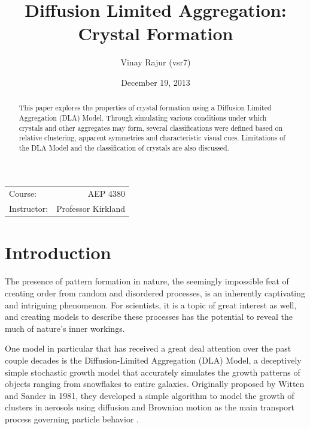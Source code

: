\documentclass{article}
\title{Diffusion Limited Aggregation: Crystal Formation} %
\author{Vinay Rajur (vsr7)} %
\date{December 19, 2013} %
\begin{document}
\maketitle %

\begin{center}
\begin{tabular}{l r}
Course: & AEP 4380 \\ %
Instructor: & Professor Kirkland %
\end{tabular}
\end{center}

\begin{abstract}
This paper explores the properties of crystal formation using a Diffusion Limited Aggregation (DLA) Model. Through simulating various conditions under which crystals and other aggregates may form, several classifications were defined based on relative clustering, apparent symmetries and characteristic visual cues. Limitations of the DLA Model and the classification of crystals are also discussed.\\
\end{abstract}


\section{Introduction}

The presence of pattern formation in nature, the seemingly impossible feat of creating order from random and disordered processes, is an inherently captivating and intriguing phenomenon. For scientists, it is a topic of great interest as well, and creating models to describe these processes has the potential to reveal the much of nature's inner workings.

One model in particular that has received a great deal attention over the past couple decades is the Diffusion-Limited Aggregation (DLA) Model, a deceptively simple stochastic growth model that accurately simulates the growth patterns of objects ranging from snowflakes to entire galaxies. Originally proposed by Witten and Sander in 1981, they developed a simple algorithm to model the growth of clusters in aerosols using diffusion and Brownian motion as the main transport process governing particle behavior \cite{originalDLA}. 
\end{document}
